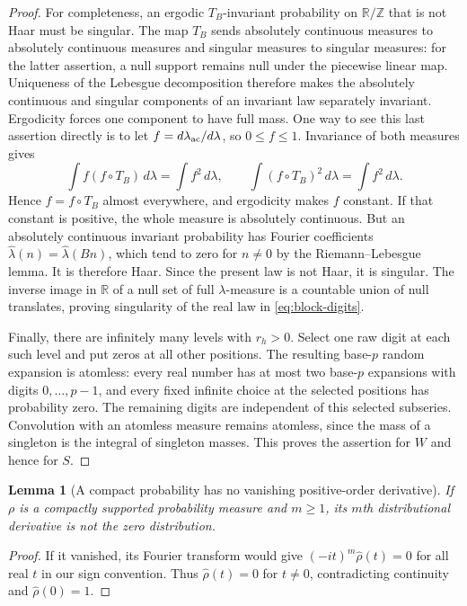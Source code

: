 \documentclass[11pt,a4paper]{article}
\newtheorem{lemma}[theorem]{Lemma}
\theoremstyle{remark}
\newcommand{\R}{\mathbb R}
\newcommand{\T}{\mathbb R/\mathbb Z}
\newcommand{\cf}[1]{\widehat{#1}}
\begin{document}
\begin{proof}
For completeness, an ergodic $T_B$-invariant probability on $\T$ that is not
Haar must be singular. The map $T_B$ sends absolutely continuous measures to
absolutely continuous measures and singular measures to singular measures:
for the latter assertion, a null support remains null under the piecewise
linear map. Uniqueness of the Lebesgue decomposition therefore makes the
absolutely continuous and singular components of an invariant law separately
invariant. Ergodicity forces one component to have full mass. One way to see
this last assertion directly is to let $f=d\lambda_{\rm ac}/d\lambda$, so
$0\le f\le1$. Invariance of both measures gives
\[
 \int f(f\circ T_B)\,d\lambda=\int f^2\,d\lambda,
 \qquad
 \int(f\circ T_B)^2\,d\lambda=\int f^2\,d\lambda.
\]
Hence $f=f\circ T_B$ almost everywhere, and ergodicity makes $f$ constant.
If that constant is positive, the whole measure is absolutely continuous.
But an absolutely continuous invariant probability has Fourier coefficients
$\cf\lambda(n)=\cf\lambda(Bn)$, which tend to zero for $n\ne0$ by the
Riemann--Lebesgue lemma. It is therefore Haar. Since the present law is not
Haar, it is singular. The inverse image in $\R$ of a null set of full
$\lambda$-measure is a countable union of null translates, proving singularity
of the real law in \eqref{eq:block-digits}.

Finally, there are infinitely many levels with $r_h>0$. Select one raw digit
at each such level and put zeros at all other positions. The resulting base-$p$
random expansion is atomless: every real number has at most two base-$p$
expansions with digits $0,\ldots,p-1$, and every fixed infinite choice at the
selected positions has probability zero. The remaining digits are independent
of this selected subseries. Convolution with an atomless measure remains
atomless, since the mass of a singleton is the integral of singleton masses.
This proves the assertion for $W$ and hence for $S$.
\end{proof}

\begin{lemma}[A compact probability has no vanishing positive-order derivative]
\label{lem:nonzero-derivative}
If $\rho$ is a compactly supported probability measure and $m\ge1$, its
$m$th distributional derivative is not the zero distribution.
\end{lemma}
\begin{proof}
If it vanished, its Fourier transform would give
$(-it)^m\cf\rho(t)=0$ for all real $t$ in our sign convention. Thus
$\cf\rho(t)=0$ for $t\ne0$, contradicting continuity and $\cf\rho(0)=1$.
\end{proof}
\end{document}
